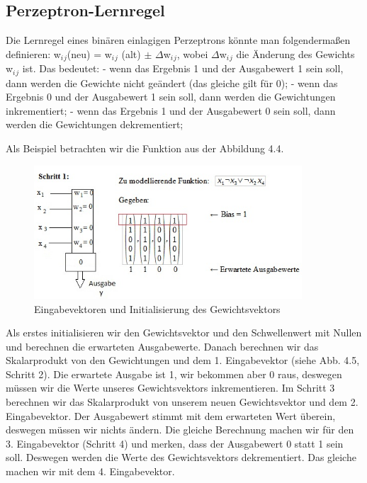 \subsection{Perzeptron-Lernregel}

Die Lernregel eines binären einlagigen Perzeptrons könnte man folgendermaßen definieren:
\newline
w$_i$$_j$(neu) = w$_i$$_j$ (alt) $\pm$ $\Delta$w$_i$$_j$,
\newline wobei $\Delta$w$_i$$_j$ die Änderung des Gewichts w$_i$$_j$ ist. Das bedeutet:
\newline
- wenn das Ergebnis 1 und der Ausgabewert 1 sein soll, dann werden die Gewichte nicht geändert (das gleiche gilt für 0);
\newline
- wenn das Ergebnis 0 und der Ausgabewert 1 sein soll, dann werden die Gewichtungen inkrementiert;
\newline
- wenn das Ergebnis 1 und der Ausgabewert 0 sein soll, dann werden die Gewichtungen dekrementiert;

Als Beispiel betrachten wir die Funktion aus der Abbildung 4.4.

\begin{figure}[h]
\centering
\includegraphics[width=10cm]{chapters/neural_networks/schritt1.jpg}

\caption{Eingabevektoren und Initialisierung des Gewichtsvektors}
	\label{img:einlagiges Perzeptron}

\end{figure}

Als erstes initialisieren wir den Gewichtsvektor und den Schwellenwert mit Nullen und berechnen die erwarteten Ausgabewerte. Danach berechnen wir das Skalarprodukt von den Gewichtungen und dem 1. Eingabevektor (siehe Abb. 4.5, Schritt 2). Die erwartete Ausgabe ist 1, wir bekommen aber 0 raus, deswegen müssen wir die Werte unseres Gewichtsvektors inkrementieren. Im Schritt 3 berechnen wir das Skalarprodukt von unserem neuen Gewichtsvektor und dem 2. Eingabevektor. Der Ausgabewert stimmt mit dem erwarteten Wert überein, deswegen müssen wir nichts ändern. Die gleiche Berechnung machen wir für den 3. Eingabevektor (Schritt 4) und merken, dass der Ausgabewert 0 statt 1 sein soll. Deswegen werden  die Werte des Gewichtsvektors dekrementiert. Das gleiche machen wir mit dem 4. Eingabevektor.


